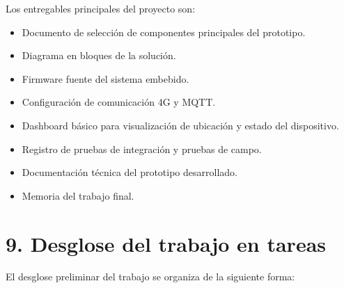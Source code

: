 \documentclass[
11pt, %
]{charter}
\begin{document}
Los entregables principales del proyecto son:
\begin{itemize}
	\item Documento de selección de componentes principales del prototipo.
	\item Diagrama en bloques de la solución.
	\item Firmware fuente del sistema embebido.
	\item Configuración de comunicación 4G y MQTT.
	\item Dashboard básico para visualización de ubicación y estado del dispositivo.
	\item Registro de pruebas de integración y pruebas de campo.
	\item Documentación técnica del prototipo desarrollado.
	\item Memoria del trabajo final.
\end{itemize}


\section{9. Desglose del trabajo en tareas}
\label{sec:wbs}

El desglose preliminar del trabajo se organiza de la siguiente forma:
\end{document}
